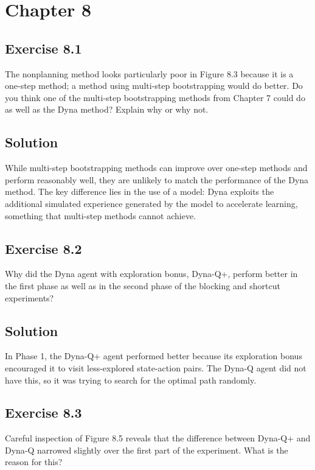 \section*{Chapter 8}

\subsection*{Exercise 8.1}
The nonplanning method looks particularly poor in Figure 8.3 because it is
a one-step method; a method using multi-step bootstrapping would do better. Do you
think one of the multi-step bootstrapping methods from Chapter 7 could do as well as
the Dyna method? Explain why or why not.

\subsection*{Solution}
While multi-step bootstrapping methods can improve over one-step methods and perform
reasonably well, they are unlikely to match the performance of the Dyna method. The key
difference lies in the use of a model: Dyna exploits the additional simulated experience
generated by the model to accelerate learning, something that multi-step methods cannot
achieve.

\subsection*{Exercise 8.2}
Why did the Dyna agent with exploration bonus, Dyna-Q+, perform
better in the first phase as well as in the second phase of the blocking and shortcut
experiments?

\subsection*{Solution}

In Phase 1, the Dyna-Q+ agent performed better because its exploration bonus encouraged
it to visit less-explored state-action pairs. The Dyna-Q agent did not have this,
so it was trying to search for the optimal path randomly.

\subsection*{Exercise 8.3}
Careful inspection of Figure 8.5 reveals that the difference between Dyna-Q+
and Dyna-Q narrowed slightly over the first part of the experiment. What is the reason
for this?

